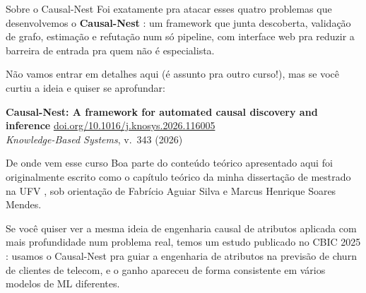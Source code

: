 \begin{frame}{Sobre o Causal-Nest}
	Foi exatamente pra atacar esses quatro problemas que desenvolvemos o \textbf{Causal-Nest} \cite{causal-nest-kbs}: um framework que junta descoberta, validação de grafo, estimação e refutação num só pipeline, com interface web pra reduzir a barreira de entrada pra quem não é especialista.

	\pause
	\vfill
	Não vamos entrar em detalhes aqui (é assunto pra outro curso!), mas se você curtiu a ideia e quiser se aprofundar:

	\begin{center}
		\textbf{Causal-Nest: A framework for automated causal discovery and inference} 
		\small \href{https://doi.org/10.1016/j.knosys.2026.116005}{doi.org/10.1016/j.knosys.2026.116005} \\
		\textit{Knowledge-Based Systems}, v.~343 (2026)
	\end{center}
\end{frame}

\begin{frame}{De onde vem esse curso}
	Boa parte do conteúdo teórico apresentado aqui foi originalmente escrito como o capítulo teórico da minha dissertação de mestrado na UFV \cite{diss-viegas2026}, sob orientação de Fabrício Aguiar Silva e Marcus Henrique Soares Mendes.

	\pause
	\vfill
	Se você quiser ver a mesma ideia de engenharia causal de atributos aplicada com mais profundidade num problema real, temos um estudo publicado no CBIC 2025 \cite{CBIC2025-1175578}: usamos o Causal-Nest pra guiar a engenharia de atributos na previsão de churn de clientes de telecom, e o ganho apareceu de forma consistente em vários modelos de ML diferentes.
\end{frame}

